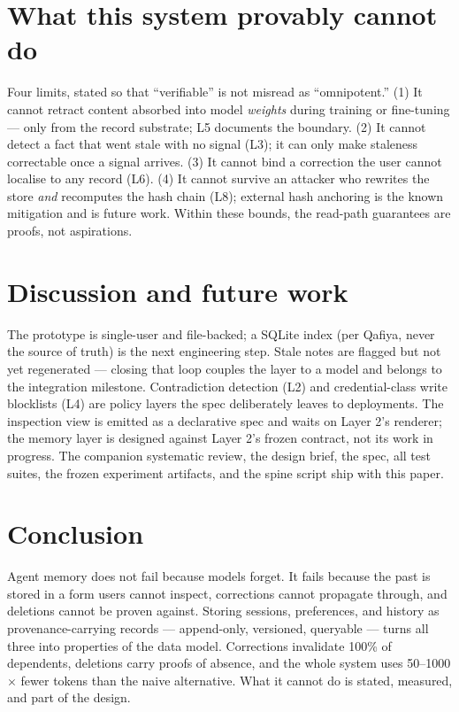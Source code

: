 \documentclass[11pt]{article}
\begin{document}
\section{What this system provably cannot do}
\label{sec:honesty}
Four limits, stated so that ``verifiable'' is not misread as ``omnipotent.'' (1) It cannot retract content absorbed into model \emph{weights} during training or fine-tuning --- only from the record substrate; L5 documents the boundary. (2) It cannot detect a fact that went stale with no signal (L3); it can only make staleness correctable once a signal arrives. (3) It cannot bind a correction the user cannot localise to any record (L6). (4) It cannot survive an attacker who rewrites the store \emph{and} recomputes the hash chain (L8); external hash anchoring is the known mitigation and is future work. Within these bounds, the read-path guarantees are proofs, not aspirations.

\section{Discussion and future work}
The prototype is single-user and file-backed; a SQLite index (per Qafiya, never the source of truth) is the next engineering step. Stale notes are flagged but not yet regenerated --- closing that loop couples the layer to a model and belongs to the integration milestone. Contradiction detection (L2) and credential-class write blocklists (L4) are policy layers the spec deliberately leaves to deployments. The inspection view is emitted as a declarative spec and waits on Layer 2's renderer; the memory layer is designed against Layer 2's frozen contract, not its work in progress. The companion systematic review, the design brief, the spec, all test suites, the frozen experiment artifacts, and the spine script ship with this paper.

\section{Conclusion}
Agent memory does not fail because models forget. It fails because the past is stored in a form users cannot inspect, corrections cannot propagate through, and deletions cannot be proven against. Storing sessions, preferences, and history as provenance-carrying records --- append-only, versioned, queryable --- turns all three into properties of the data model. Corrections invalidate 100\% of dependents, deletions carry proofs of absence, and the whole system uses 50--1000$\times$ fewer tokens than the naive alternative. What it cannot do is stated, measured, and part of the design.
\end{document}
